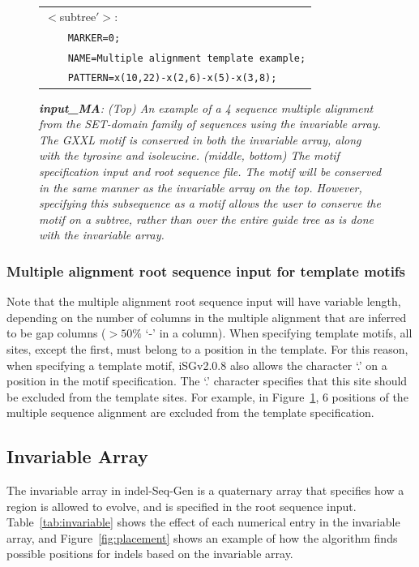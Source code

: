 \documentclass[10pt]{article}
\newcommand{\version}{2.0.8 }
\newcommand{\iSGcurrentshort}{iSGv\version }
\begin{document}
\begin{figure}[Htbp]
\begin{tabular}{|l|}
$<$subtree$'>$:\\
\verb+    MARKER=0;+\\
\verb+    NAME=Multiple alignment template example;+\\
\verb+    PATTERN=x(10,22)-x(2,6)-x(5)-x(3,8);+\\
\hline
\end{tabular}
\caption{\textit{{\bf input\_MA}: (Top) An example of a 4 sequence multiple alignment from the SET-domain family of sequences using the invariable array.  The GXXL motif is conserved in both the invariable array, along with the tyrosine and isoleucine. (middle, bottom) The motif specification input and root sequence file. The motif will be conserved in the same manner as the invariable array on the top. However, specifying this subsequence as a motif allows the user to conserve the motif on a subtree, rather than over the entire guide tree as is done with the invariable array.}}
\label{fig:input_MA}
\end{figure}

 \subsubsection{Multiple alignment root sequence input for template motifs}

 Note that the multiple alignment root sequence input will have variable length, depending on the number of columns in the multiple alignment that are inferred to be gap columns ($>50\%$ `-' in a column). When specifying template motifs, all sites, except the first, must belong to a position in the template. For this reason, when specifying a template motif, \iSGcurrentshort also allows the character `.' on a position in the motif specification. The `.' character specifies that this site should be excluded from the template sites. For example, in Figure~\ref{fig:input_MA}, 6 positions of the multiple sequence alignment are excluded from the template specification.

\subsection{Invariable Array}

The invariable array in indel-Seq-Gen is a quaternary array that specifies how a region is
allowed to evolve, and is specified in the root sequence input. Table~\ref{tab:invariable}
shows the effect of each numerical entry in the invariable array, and Figure~\ref{fig:placement} shows an example of how the algorithm finds possible positions for indels based on the invariable array.
\end{document}
